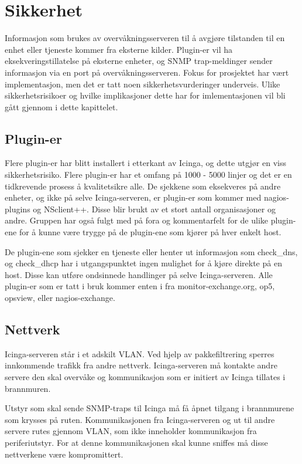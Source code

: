 \chapter{Sikkerhet}\label{chap:sikkerhet}
Informasjon som brukes av overvåkningsserveren til å avgjøre tilstanden til en enhet eller tjeneste kommer fra eksterne kilder. Plugin-er vil ha eksekveringstillatelse på eksterne enheter, og SNMP trap-meldinger sender informasjon via en port på overvåkningsserveren. Fokus for prosjektet har vært implementasjon, men det er tatt noen sikkerhetsvurderinger underveis. Ulike sikkerhetsrisikoer og hvilke implikasjoner dette har for imlementasjonen vil bli gått gjennom i dette kapittelet.

\section{Plugin-er}
Flere plugin-er har blitt installert i etterkant av Icinga, og dette utgjør en viss sikkerhetsrisiko. Flere plugin-er har et omfang på 1000 - 5000 linjer og det er en tidkrevende prosess å kvalitetsikre alle. De sjekkene som eksekveres på andre enheter, og ikke på selve Icinga-serveren, er plugin-er som kommer med nagios-plugins og NSclient++. Disse blir brukt av et stort antall organisasjoner og andre. Gruppen har også fulgt med på fora og kommentarfelt for de ulike plugin-ene for å kunne være trygge på de plugin-ene som kjører på hver enkelt host. 

De plugin-ene som sjekker en tjeneste eller henter ut informasjon som check\_dns, og check\_dhcp har i utgangspunktet ingen mulighet for å kjøre direkte på en host. Disse kan utføre ondsinnede handlinger på selve Icinga-serveren. Alle plugin-er som er tatt i bruk kommer enten i fra monitor-exchange.org, op5, opsview, eller nagios-exchange.
\section{Nettverk}
Icinga-serveren står i et adskilt VLAN. Ved hjelp av pakkefiltrering sperres innkommende trafikk fra andre nettverk. Icinga-serveren må kontakte andre servere den skal overvåke og kommunikasjon som er initiert av Icinga tillates i brannmuren. 

Utstyr som skal sende SNMP-traps til Icinga må få åpnet tilgang i brannmurene som krysses på ruten. Kommunikasjonen fra Icinga-serveren og ut til andre servere rutes gjennom VLAN, som ikke inneholder kommunikasjon fra periferiutstyr. For at denne kommunikasjonen skal kunne sniffes må disse nettverkene være kompromittert.
